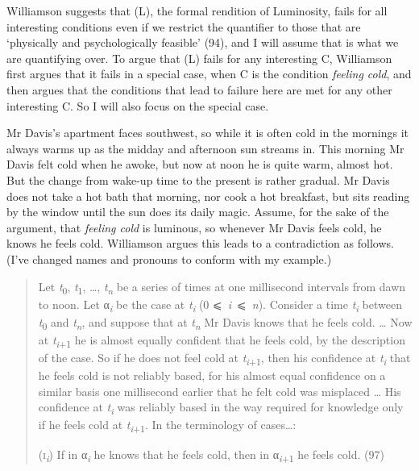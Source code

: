 \documentclass[
  11pt,
  letterpaper,
  DIV=11,
  numbers=noendperiod,
  twoside]{scrartcl}
\begin{document}
Williamson suggests that (L), the formal rendition of Luminosity, fails
for all interesting conditions even if we restrict the quantifier to
those that are `physically and psychologically feasible' (94), and I
will assume that is what we are quantifying over. To argue that (L)
fails for any interesting C, Williamson first argues that it fails in a
special case, when C is the condition \emph{feeling cold}, and then
argues that the conditions that lead to failure here are met for any
other interesting C. So I will also focus on the special case.

Mr Davis's apartment faces southwest, so while it is often cold in the
mornings it always warms up as the midday and afternoon sun streams in.
This morning Mr Davis felt cold when he awoke, but now at noon he is
quite warm, almost hot. But the change from wake-up time to the present
is rather gradual. Mr Davis does not take a hot bath that morning, nor
cook a hot breakfast, but sits reading by the window until the sun does
its daily magic. Assume, for the sake of the argument, that
\emph{feeling cold} is luminous, so whenever Mr Davis feels cold, he
knows he feels cold. Williamson argues this leads to a contradiction as
follows. (I've changed names and pronouns to conform with my example.)

\begin{quote}
Let \emph{t}\textsubscript{0}, \emph{t}\textsubscript{1}, \ldots,
\emph{t\textsubscript{n}} be a series of times at one millisecond
intervals from dawn to noon. Let α\textsubscript{\emph{i}} be the case
at \emph{t\textsubscript{i}} (0 ⩽~\emph{i}~⩽~\emph{n}). Consider a time
\emph{t\textsubscript{i}} between \emph{t}\textsubscript{0} and
\emph{t\textsubscript{n}}, and suppose that at \emph{t\textsubscript{n}}
Mr Davis knows that he feels cold. \ldots{} Now at
\emph{t\textsubscript{i}}\textsubscript{+1} he is almost equally
confident that he feels cold, by the description of the case. So if he
does not feel cold at \emph{t\textsubscript{i}}\textsubscript{+1}, then
his confidence at \emph{t\textsubscript{i}} that he feels cold is not
reliably based, for his almost equal confidence on a similar basis one
millisecond earlier that he felt cold was misplaced \ldots{} His
confidence at \emph{t\textsubscript{i}} was reliably based in the way
required for knowledge only if he feels cold at
\emph{t\textsubscript{i}}\textsubscript{+1}. In the terminology of
cases\ldots:

(\textsc{i}\textsubscript{\emph{i}}) If in α\textsubscript{\emph{i}} he
knows that he feels cold, then in α\textsubscript{\emph{i}+1} he feels
cold. (97)
\end{quote}
\end{document}
